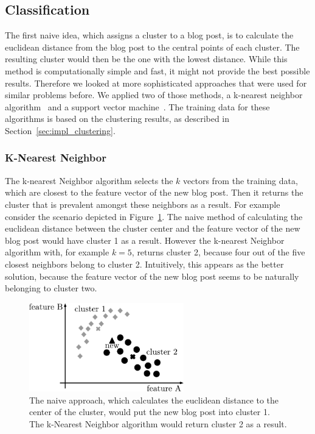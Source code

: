 \subsection{Classification}
\label{sec:impl_classification}


The first naive idea, which assigns a cluster to a blog post, is to calculate the euclidean distance from the blog post to the central points of each cluster.
The resulting cluster would then be the one with the lowest distance.
While this method is computationally simple and fast, it might not provide the best possible results.
Therefore we looked at more sophisticated approaches that were used for similar problems before.
We applied two of those methods, a k-nearest neighbor algorithm~\cite{peterson2009k} and a support vector machine~\cite{kolari2006svms}.
The training data for these algorithms is based on the clustering results, as described in Section~\ref{sec:impl_clustering}.


\subsubsection{K-Nearest Neighbor}
\label{sec:k_nearest_neighbor}


The k-nearest Neighbor algorithm selects the $k$ vectors from the training data, which are closest to the feature vector of the new blog post.
Then it returns the cluster that is prevalent amongst these neighbors as a result.
For example consider the scenario depicted in Figure~\ref{fig:naive}.
The naive method of calculating the euclidean distance between the cluster center and the feature vector of the new blog post would have cluster 1 as a result.
However the k-nearest Neighbor algorithm with, for example $k=5$, returns cluster 2, because four out of the five closest neighbors belong to cluster 2.
Intuitively, this appears as the better solution, because the feature vector of the new blog post seems to be naturally belonging to cluster two.


\begin{figure}[ht!]
    \centering
    \includegraphics[width=0.6\textwidth]{images/naive.pdf}
    \caption{The naive approach, which calculates the euclidean distance to the center of the cluster, would put the new blog post into cluster 1. The k-Nearest Neighbor algorithm would return cluster 2 as a result.}
    \label{fig:naive}
\end{figure}


